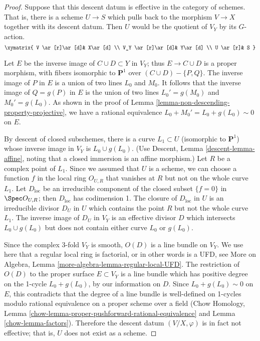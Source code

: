 \begin{proof}
\medskip\noindent
Suppose that this descent datum is effective in the category
of schemes. That is, there is a scheme $U\to S$
which pulls back to the morphism $V\to X$ together
with its descent datum. Then $U$ would be the quotient
of $V_Y$ by its $G$-action.
$$
\xymatrix{
V \ar[r]\ar[d]&  X\ar[d] \\
V_Y \ar[r]\ar[d]& Y\ar[d] \\
U \ar[r]& S
}
$$

\medskip\noindent
Let $E$ be the inverse image of $C\cup D\subset Y$ in $V_Y$;
thus $E\rightarrow C\cup D$ is a proper morphism, with fibers
isomorphic to ${\mathbf P}^1$ over $(C\cup D)-\{P,Q\}$.
The inverse image of $P$ in $E$ is a union of two lines $L_0$
and $M_0$. It follows that the inverse image of $Q=g(P)$ in $E$
is the union of two lines $L_0'=g(M_0)$ and $M_0'=g(L_0)$.
As shown in the proof
of Lemma \ref{lemma-non-descending-property-projective},
we have a rational equivalence $L_0+M_0'=L_0+g(L_0)\sim 0$ on $E$.

\medskip\noindent
By descent of closed subschemes, there is a curve $L_1\subset U$
(isomorphic to ${\mathbf P}^1$)
whose inverse image in $V_Y$ is $L_0\cup g(L_0)$. (Use Descent, Lemma
\ref{descent-lemma-affine}, noting that a closed immersion is an affine
morphism.)
Let $R$ be a complex point of $L_1$. Since
we assumed that $U$ is a scheme, we can choose a function
$f$ in the local ring $O_{U,R}$ that vanishes at $R$ but not
on the whole curve $L_1$. Let $D_{\text{loc}}$ be an irreducible component
of the closed subset $\{f = 0\}$ in $\Spec O_{U,R}$; then
$D_{\text{loc}}$ has codimension 1.
The closure of $D_{\text{loc}}$ in $U$ is an irreducible divisor $D_U$
in $U$ which contains the point $R$ but not the whole curve $L_1$.
The inverse image of $D_U$ in $V_Y$ is an effective divisor $D$
which intersects $L_0\cup g(L_0)$ but does not contain either
curve $L_0$ or $g(L_0)$.

\medskip\noindent
Since the complex 3-fold $V_Y$ is smooth, $O(D)$ is a line
bundle on $V_Y$. We use here that a regular local ring is factorial,
or in other words is a UFD, see
More on Algebra, Lemma \ref{more-algebra-lemma-regular-local-UFD}.
The restriction of $O(D)$ to the proper surface
$E\subset V_Y$ is a line bundle which has positive degree on the 1-cycle
$L_0+g(L_0)$, by our information on $D$. Since
$L_0+g(L_0)\sim 0$ on $E$, this contradicts 
that the degree of a line bundle is well-defined
on 1-cycles modulo rational equivalence on a proper scheme
over a field (Chow Homology,
Lemma \ref{chow-lemma-proper-pushforward-rational-equivalence}
and Lemma \ref{chow-lemma-factors}). Therefore the descent datum
$(V/X,\varphi)$ is in fact not effective; that is, $U$ does not exist
as a scheme.
\end{proof}

